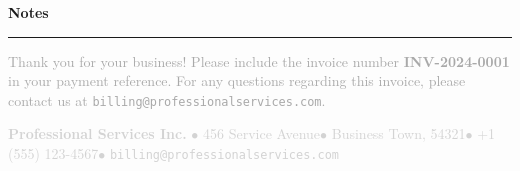 \documentclass[11pt,a4paper]{article}
\makeatletter
\newcommand{\companyname}{Professional Services Inc.}
\newcommand{\companystreet}{456 Service Avenue}
\newcommand{\companycity}{Business Town, 54321}
\newcommand{\companyphone}{+1 (555) 123-4567}
\newcommand{\companyemail}{billing@professionalservices.com}
\newcommand{\invoicenumber}{INV-2024-0001}
\makeatother
\begin{document}
\vspace{0.5cm}

\noindent
{\Large\textbf{\textcolor{primaryblue}{Notes}}}
\par\vspace{-0.2cm}
\noindent
\textcolor{primaryblue}{\rule{\textwidth}{0.8pt}}
\vspace{0.3cm}
\textcolor{darkgray}{%
\small Thank you for your business! Please include the invoice number \textbf{\invoicenumber} in your payment reference. For any questions regarding this invoice, please contact us at \texttt{\companyemail}.
}

\vspace{0.8cm}
\begin{center}
    {\small\textcolor{lightgray}{%
        \textbf{\companyname} $\bullet$ \companystreet $\bullet$ \companycity $\bullet$ \companyphone $\bullet$ \texttt{\companyemail}
    }}
\end{center}
\end{document}
